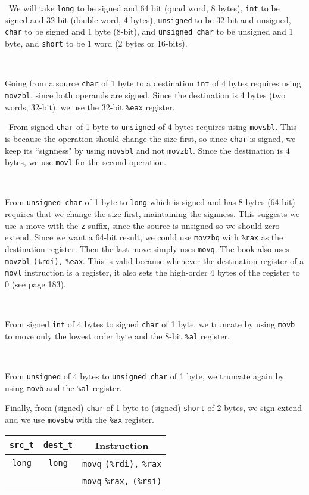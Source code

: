 \documentclass[12pt]{article}
\newenvironment{sol}[1][Solution]{\begin{trivlist}
		\item[\hskip \labelsep {\bfseries #1:}]}{\end{trivlist}}
\begin{document}
{\begin{sol}
	\
	We will take \texttt{long} to be signed and 64 bit (quad word, 8 bytes), \texttt{int}
	to be signed and 32 bit (double word, 4 bytes), \texttt{unsigned} to be 32-bit and unsigned,
	\texttt{char} to be signed and 1 byte (8-bit), and \texttt{unsigned char} to be unsigned and 1 byte,
	and \texttt{short} to be 1 word (2 bytes or 16-bits).
	
	\
	
	Going from a source \texttt{char} of 1 byte to a destination \texttt{int} of 4 bytes
	requires using \texttt{movzbl}, since both operands are signed. Since the destination
	is 4 bytes (two words, 32-bit), we use the 32-bit \texttt{\%eax} register.
	
	\
	From signed \texttt{char} of 1 byte to \texttt{unsigned} of 4 bytes requires
	using \texttt{movsbl}. This is because the operation should change the size first, so
	since \texttt{char} is signed, we keep its ``signness" by using \texttt{movsbl} and not
	\texttt{movzbl}. Since the destination is 4 bytes, we use \texttt{movl} for the second operation.
	
	\
	
	From \texttt{unsigned char} of 1 byte to \texttt{long} which is signed and has 8 bytes (64-bit)
	requires that we change the size first, maintaining the signness. This suggests we use a move
	with the \texttt{z} suffix, since the source is unsigned so we should zero extend.
	Since we want a 64-bit result, we could use \texttt{movzbq} with \texttt{\%rax} as the
	destination register. Then the last move simply uses \texttt{movq}. The book also
	uses \texttt{movzbl} \texttt{(\%rdi),} \texttt{\%eax}. This is valid because whenever
	the destination register of a \texttt{movl} instruction is a register, it also sets the
	high-order 4 bytes of the register to 0 (see page 183).
	
	\
	
	From signed \texttt{int} of 4 bytes to signed \texttt{char} of 1 byte, we truncate
	by using \texttt{movb} to move only the lowest order byte and the 8-bit \texttt{\%al} register.
	
	\
	
	From \texttt{unsigned} of 4 bytes to \texttt{unsigned char} of 1 byte, we truncate
	again by using \texttt{movb} and the \texttt{\%al} register.
	
	Finally, from (signed) \texttt{char} of 1 byte to (signed) \texttt{short} of 2 bytes,
	we sign-extend and we use \texttt{movsbw} with the \texttt{\%ax} register.
	\begin{center}
		\begin{tabular}{ccc}
			\texttt{src\_t} & \texttt{dest\_t} & Instruction\\
			\hline
			\texttt{long} & \texttt{long} & \texttt{movq} \texttt{(\%rdi),} \texttt{\%rax}\\
			{} & {} & \texttt{movq} \texttt{\%rax,} \texttt{(\%rsi)} \\
			

\end{tabular}
\end{center}
\end{sol}}
\end{document}
